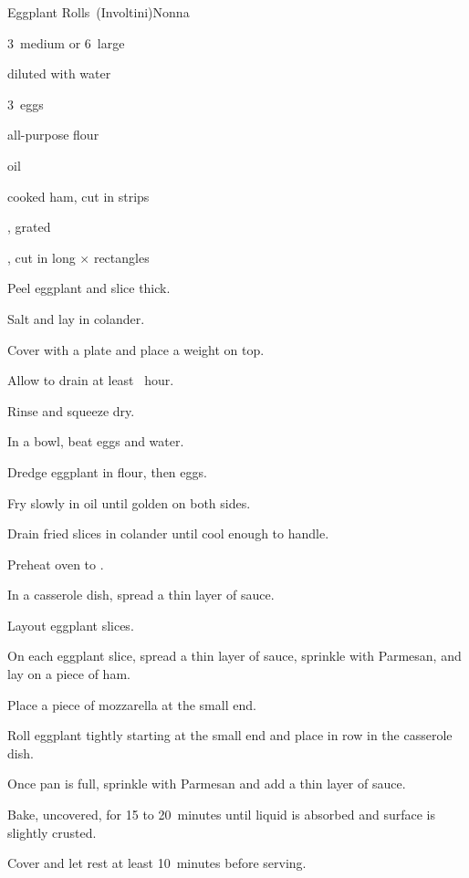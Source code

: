 \begin{recipe}{Eggplant Rolls~(Involtini)}{Nonna}{}

\begin{ingredients}
\item 3~medium  or 6~large 
\item {} diluted with water
\item 3~eggs
\item all-purpose flour
\item oil
\item cooked ham, cut in  strips
\item {}, grated
\item {}, cut in long \inch{\quarter}$\times$\inch{\quarter} rectangles
\end{ingredients}

\begin{directions}
\item Peel eggplant and slice \inch{\quarter} thick.
\item Salt and lay in colander.
\item Cover with a plate and place a weight on top.
\item Allow to drain at least \half{}~hour.
\item Rinse and squeeze dry.
\item In a bowl, beat eggs and \C{\half} water.
\item Dredge eggplant in flour, then eggs.
\item Fry slowly in  oil until golden on both sides.
\item Drain fried slices in colander until cool enough to handle.
\item Preheat oven to .
\item In a casserole dish, spread a thin layer of sauce.
\item Layout eggplant slices.
\item On each eggplant slice, spread a thin layer of sauce, sprinkle with Parmesan, and lay on a piece of ham.
\item Place a piece of mozzarella at the small end.
\item Roll eggplant tightly starting at the small end and place in row in the casserole dish.
\item Once pan is full, sprinkle with Parmesan and add a thin layer of sauce.
\item Bake, uncovered, for 15 to 20~minutes until liquid is absorbed and surface is slightly crusted.
\item Cover and let rest at least 10~minutes before serving.
\end{directions}

\end{recipe}
